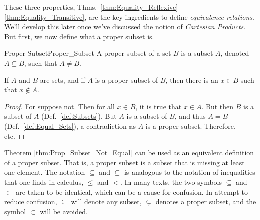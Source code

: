 \documentclass[crop=false,class=book,oneside]{standalone}
\begin{document}
            These three properties,
            Thms.~\ref{thm:Equality_Reflexive}-%
            \ref{thm:Equality_Transitive}, are the key
            ingredients to define \textit{equivalence relations}.
            We'll develop this later once we've discussed the
            notion of \textit{Cartesian Products}. But first, we
            now define what a proper subset is.
            \begin{ldefinition}{Proper Subset}{Proper_Subset}
                A \gls{proper subset} of a set $B$ is a
                subset $A$, denoted $A\subsetneq{B}$, such that
                $A\ne{B}$.
            \end{ldefinition}
            \begin{theorem}
                \label{thm:Prop_Subset_Not_Equal}%
                If $A$ and $B$ are sets, and if $A$ is a proper
                subset of $B$, then there is an $x\in{B}$ such
                that $x\notin{A}$.
            \end{theorem}
            \begin{proof}
                For suppose not. Then for all $x\in{B}$,
                it is true that $x\in{A}$. But then
                $B$ is a subset of $A$ (Def.~\ref{def:Subsets}).
                But $A$ is a subset of $B$, and thus $A=B$
                (Def.~\ref{def:Equal_Sets}), a contradiction as
                $A$ is a proper subset. Therefore, etc.
            \end{proof}
            Theorem \ref{thm:Prop_Subset_Not_Equal} can
            be used as an equivalent definition of a proper
            subset. That is, a proper subset is a subset that
            is missing at least one element. The notation
            $\subseteq$ and $\subsetneq$ is analogous to the
            notation of inequalities that one finds in calculus,
            $\leq$ and $<$. In many texts, the two symbols
            $\subseteq$ and $\subset$ are taken to be identical,
            which can be a cause for confusion. In attempt to
            reduce confusion, $\subseteq$ will denote any subset,
            $\subsetneq$ denotes a proper subset, and the symbol
            $\subset$ will be avoided.
\end{document}
